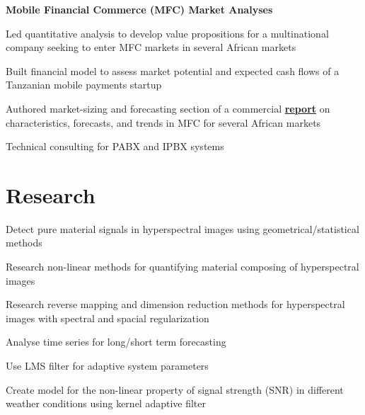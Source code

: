 \documentclass[letterpaper]{deedy-resume} %
\begin{document}
\begin{minipage}[t]{0.66\textwidth}
\begin{tightitemize}
\item {\bf Mobile Financial Commerce (MFC) Market Analyses}
\begin{tightitemize}
\vspace{\topsep} %
\item Led quantitative analysis to develop value propositions for a multinational company seeking to enter MFC markets in several African markets
\item Built financial model to assess market potential and expected cash flows of a Tanzanian mobile payments startup
\item Authored market-sizing and forecasting section of a commercial \href{http://www.mondato.com/publications/}{\bf report} on characteristics, forecasts, and trends in MFC for several African markets
\end{tightitemize}
\end{tightitemize}
\sectionspace %

\begin{tightitemize}
\item Technical consulting for PABX and IPBX systems
\end{tightitemize}
\sectionspace %

\section {
    Research
}
\begin{tightitemize}
\item Detect pure material signals in hyperspectral images using geometrical/statistical methods
\item Research non-linear methods for quantifying material composing of hyperspectral images
\item Research reverse mapping and dimension reduction methods for hyperspectral images with spectral and spacial regularization
\end{tightitemize}
\sectionspace %

\begin{tightitemize}
\item Analyse time series for long/short term forecasting
\item Use LMS filter for adaptive system parameters
\item Create model for the non-linear property of signal strength (SNR) in different weather conditions using kernel adaptive filter
\end{tightitemize}
\sectionspace %



\end{minipage}
\end{document}
